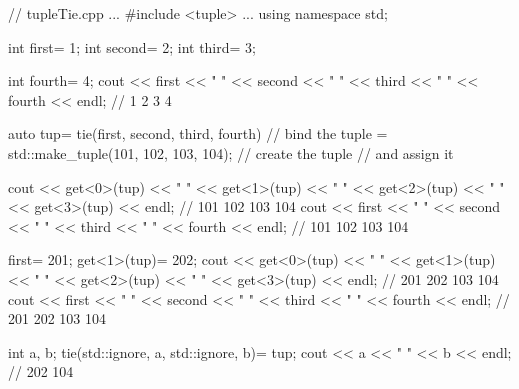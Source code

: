 \begin{cpp}
// tupleTie.cpp
...
#include <tuple>
...
using namespace std;

int first= 1;
int second= 2;
int third= 3;

int fourth= 4;
cout << first << " " << second << " "
	 << third << " " << fourth << endl; // 1 2 3 4

auto tup= tie(first, second, third, fourth) // bind the tuple
		= std::make_tuple(101, 102, 103, 104); // create the tuple
												// and assign it

cout << get<0>(tup) << " " << get<1>(tup) << " " << get<2>(tup)
	 << " " << get<3>(tup) << endl; // 101 102 103 104
cout << first << " " << second << " " << third << " "
	 << fourth << endl; // 101 102 103 104

first= 201;
get<1>(tup)= 202;
cout << get<0>(tup) << " " << get<1>(tup) << " " << get<2>(tup)
	 << " " << get<3>(tup) << endl; // 201 202 103 104
cout << first << " " << second << " " << third << " "
	 << fourth << endl; // 201 202 103 104

int a, b;
tie(std::ignore, a, std::ignore, b)= tup;
cout << a << " " << b << endl; // 202 104
\end{cpp}








